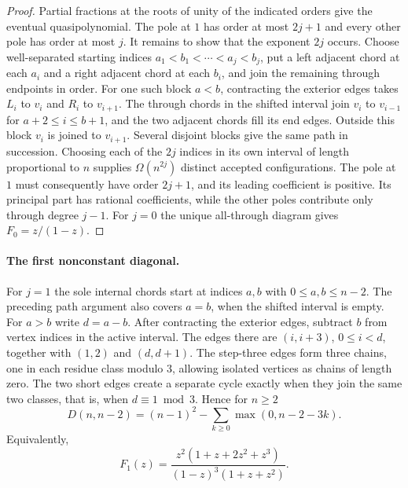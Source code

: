 \begin{proof}
Partial fractions at the roots of unity of the indicated orders
give the eventual quasipolynomial. The pole at \(1\) has order at most
\(2j+1\) and every other pole has order at most \(j\). It remains to
show that the exponent \(2j\) occurs. Choose well-separated starting
indices \(a_1<b_1<\cdots<a_j<b_j\), put a left adjacent chord at each
\(a_i\) and a right adjacent chord at each \(b_i\), and join the remaining
through endpoints in order. For one such block \(a<b\), contracting the
exterior edges takes \(L_i\) to \(v_i\) and \(R_i\) to \(v_{i+1}\).
The through chords in the shifted interval join \(v_i\) to \(v_{i-1}\)
for \(a+2\le i\le b+1\), and the two adjacent chords fill its end edges.
Outside this block \(v_i\) is joined to \(v_{i+1}\). Several disjoint
blocks give the same path in succession. Choosing each of the \(2j\)
indices in its own interval of length proportional to \(n\) supplies
\(\Omega(n^{2j})\) distinct accepted configurations. The pole at \(1\)
must consequently have order \(2j+1\), and its leading coefficient is
positive. Its principal part has rational coefficients, while the other
poles contribute only through degree \(j-1\). For \(j=0\) the unique
all-through diagram gives \(F_0=z/(1-z)\).
\end{proof}

\paragraph{The first nonconstant diagonal.}
For \(j=1\) the sole internal chords start at indices \(a,b\) with
\(0\le a,b\le n-2\). The preceding path argument also covers \(a=b\),
when the shifted interval is empty. For \(a>b\) write \(d=a-b\).
After contracting the exterior edges, subtract \(b\) from vertex indices
in the active interval. The edges there are
\((i,i+3)\), \(0\le i<d\), together with \((1,2)\) and \((d,d+1)\).
The step-three edges form three chains, one in each residue class
modulo \(3\), allowing isolated vertices as chains of length zero.
The two short edges create a separate cycle exactly when they join
the same two classes, that is, when \(d\equiv1\bmod3\). Hence for \(n\ge2\)
\[
        D(n,n-2)=(n-1)^2-\sum_{k\ge0}\max(0,n-2-3k).
\]
Equivalently,
\[
        F_1(z)=\frac{z^2(1+z+2z^2+z^3)}
                         {(1-z)^3(1+z+z^2)}.
\]

